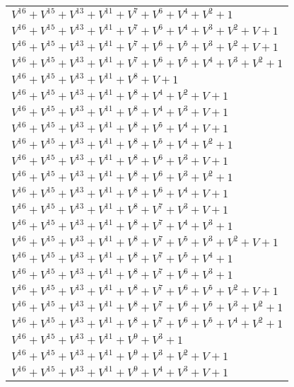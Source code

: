 \documentclass[12pt]{article}
\begin{document}
\begin{adjustwidth}{-4cm}{}
\begin{center}
\begin{longtable}{|l|}
$V^{16}  +V^{15}  +V^{13}  +V^{11}  +V^{7}  +V^{6}  +V^{4}  +V^{2}  + 1$ \\
$V^{16}  +V^{15}  +V^{13}  +V^{11}  +V^{7}  +V^{6}  +V^{4}  +V^{3}  +V^{2}  + V + 1$ \\
$V^{16}  +V^{15}  +V^{13}  +V^{11}  +V^{7}  +V^{6}  +V^{5}  +V^{3}  +V^{2}  + V + 1$ \\
$V^{16}  +V^{15}  +V^{13}  +V^{11}  +V^{7}  +V^{6}  +V^{5}  +V^{4}  +V^{3}  +V^{2}  + 1$ \\
$V^{16}  +V^{15}  +V^{13}  +V^{11}  +V^{8}  + V + 1$ \\
$V^{16}  +V^{15}  +V^{13}  +V^{11}  +V^{8}  +V^{4}  +V^{2}  + V + 1$ \\
$V^{16}  +V^{15}  +V^{13}  +V^{11}  +V^{8}  +V^{4}  +V^{3}  + V + 1$ \\
$V^{16}  +V^{15}  +V^{13}  +V^{11}  +V^{8}  +V^{5}  +V^{4}  + V + 1$ \\
$V^{16}  +V^{15}  +V^{13}  +V^{11}  +V^{8}  +V^{5}  +V^{4}  +V^{2}  + 1$ \\
$V^{16}  +V^{15}  +V^{13}  +V^{11}  +V^{8}  +V^{6}  +V^{3}  + V + 1$ \\
$V^{16}  +V^{15}  +V^{13}  +V^{11}  +V^{8}  +V^{6}  +V^{3}  +V^{2}  + 1$ \\
$V^{16}  +V^{15}  +V^{13}  +V^{11}  +V^{8}  +V^{6}  +V^{4}  + V + 1$ \\
$V^{16}  +V^{15}  +V^{13}  +V^{11}  +V^{8}  +V^{7}  +V^{3}  + V + 1$ \\
$V^{16}  +V^{15}  +V^{13}  +V^{11}  +V^{8}  +V^{7}  +V^{4}  +V^{3}  + 1$ \\
$V^{16}  +V^{15}  +V^{13}  +V^{11}  +V^{8}  +V^{7}  +V^{5}  +V^{3}  +V^{2}  + V + 1$ \\
$V^{16}  +V^{15}  +V^{13}  +V^{11}  +V^{8}  +V^{7}  +V^{5}  +V^{4}  + 1$ \\
$V^{16}  +V^{15}  +V^{13}  +V^{11}  +V^{8}  +V^{7}  +V^{6}  +V^{3}  + 1$ \\
$V^{16}  +V^{15}  +V^{13}  +V^{11}  +V^{8}  +V^{7}  +V^{6}  +V^{5}  +V^{2}  + V + 1$ \\
$V^{16}  +V^{15}  +V^{13}  +V^{11}  +V^{8}  +V^{7}  +V^{6}  +V^{5}  +V^{3}  +V^{2}  + 1$ \\
$V^{16}  +V^{15}  +V^{13}  +V^{11}  +V^{8}  +V^{7}  +V^{6}  +V^{5}  +V^{4}  +V^{2}  + 1$ \\
$V^{16}  +V^{15}  +V^{13}  +V^{11}  +V^{9}  +V^{3}  + 1$ \\
$V^{16}  +V^{15}  +V^{13}  +V^{11}  +V^{9}  +V^{3}  +V^{2}  + V + 1$ \\
$V^{16}  +V^{15}  +V^{13}  +V^{11}  +V^{9}  +V^{4}  +V^{3}  + V + 1$ \\

\end{longtable}
\end{center}
\end{adjustwidth}
\end{document}
